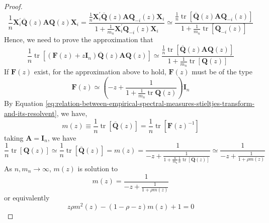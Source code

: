 \begin{proof}
    \begin{equation*}
        \frac{1}{n}\mathbf{X}_{i}^{\prime}\overline{\mathbf{Q}}(z)\mathbf{A}\mathbf{Q}(z)\mathbf{X}_{i}=\frac{\frac{1}{n}\mathbf{X}_{i}^{\prime}\overline{\mathbf{Q}}(z)\mathbf{A}\mathbf{Q}_{-i}(z)\mathbf{X}_{i}}{1+\frac{1}{m_{n}}\mathbf{X}_{i}^{\prime}\mathbf{Q}_{-i}(z)\mathbf{X}_{i}}\simeq\frac{\frac{1}{n}\operatorname{tr}\left[\overline{\mathbf{Q}}(z)\mathbf{A}\mathbf{Q}_{-i}(z)\right]}{1+\frac{1}{m_{n}}\operatorname{tr}\left[\mathbf{Q}_{-i}(z)\right]}
    \end{equation*}
    Hence, we need to prove the approximation that
    \begin{equation*}
        \frac{1}{n}\operatorname{tr}\left[\left(\mathbf{F}(z)+z\mathbf{I}_{n}\right)\overline{\mathbf{Q}}(z)\mathbf{A}\mathbf{Q}(z)\right]\simeq\frac{\frac{1}{n}\operatorname{tr}\left[\overline{\mathbf{Q}}(z)\mathbf{A}\mathbf{Q}(z)\right]}{1+\frac{1}{m_{n}}\operatorname{tr}\left[\mathbf{Q}(z)\right]}
    \end{equation*}
    If $\mathbf{F}(z)$ exist, for the approximation above to hold, $\mathbf{F}(z)$ must be of the type
    \begin{equation*}
        \mathbf{F}(z)\simeq\left(-z+\frac{1}{1+\frac{1}{m_{n}}\operatorname{tr}\mathbf{Q}(z)}\right)\mathbf{I}_{n}
    \end{equation*}
    By Equation \ref{eq:relation-between-empirical-spectral-measures-stieltjes-transform-and-its-resolvent}, we have,
    \begin{equation*}
        m(z)\equiv\frac{1}{n}\operatorname{tr}\left[\overline{\mathbf{Q}}(z)\right]=\frac{1}{n}\operatorname{tr}\left[\mathbf{F}(z)^{-1}\right]
    \end{equation*}
    taking $\mathbf{A}=\mathbf{I}_{n}$, we have
    \begin{equation*}
        \frac{1}{n}\operatorname{tr}\left[\mathbf{Q}(z)\right]\simeq\frac{1}{n}\operatorname{tr}\left[\overline{\mathbf{Q}}(z)\right]=m(z)=\frac{1}{-z+\frac{1}{1+\frac{n}{m_{n}}\frac{1}{n}\operatorname{tr}\left[\mathbf{Q}(z)\right]}}\simeq\frac{1}{-z+\frac{1}{1+\rho m(z)}}
    \end{equation*}
    As $n,m_{n}\rightarrow\infty$, $m(z)$ is solution to
    \begin{equation*}
        m(z)=\frac{1}{-z+\frac{1}{1+\rho m(z)}}
    \end{equation*}
    or equivalently
    \begin{equation*}
        z\rho m^{2}(z)-(1-\rho-z)m(z)+1=0
    \end{equation*}

\end{proof}
